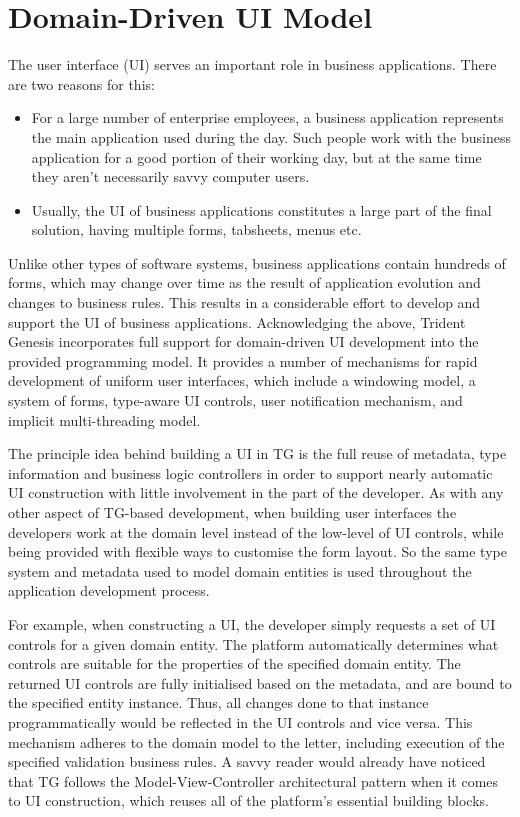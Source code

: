 \section{Domain-Driven UI Model}\label{sec:05}

  The user interface (UI) serves an important role in business applications.
  There are two reasons for this:
  \begin{itemize}
   \item For a large number of enterprise employees, a business application represents the main application used during the day. 
	 Such people work with the business application for a good portion of their working day, but at the same time they aren't necessarily savvy computer users.
   \item Usually, the UI of business applications constitutes a large part of the final solution, having multiple forms, tabsheets, menus etc.
  \end{itemize}
  Unlike other types of software systems, business applications contain hundreds of forms, which may change over time as the result of application evolution and changes to business rules.
  This results in a considerable effort to develop and support the UI of business applications.
  Acknowledging the above, Trident Genesis incorporates full support for domain-driven UI development into the provided programming model.
  It provides a number of mechanisms for rapid development of uniform user interfaces, which include a windowing model, a system of forms, type-aware UI controls, user notification mechanism, and implicit multi-threading model.
  
  The principle idea behind building a UI in TG is the full reuse of metadata, type information and business logic controllers in order to support nearly automatic UI construction with little involvement in the part of the developer.
  As with any other aspect of TG-based development, when building user interfaces the developers work at the domain level instead of the low-level of UI controls, while being provided with flexible ways to customise the form layout.
  So the same type system and metadata used to model domain entities is used throughout the application development process.
  
  For example, when constructing a UI, the developer simply requests a set of UI controls for a given domain entity.
  The platform automatically determines what controls are suitable for the properties of the specified domain entity.
  The returned UI controls are fully initialised based on the metadata, and are bound to the specified entity instance.
  Thus, all changes done to that instance programmatically would be reflected in the UI controls and vice versa.
  This mechanism adheres to the domain model to the letter, including execution of the specified validation business rules.
  A savvy reader would already have noticed that TG follows the Model-View-Controller architectural pattern when it comes to UI construction, which reuses all of the platform's essential building blocks.

